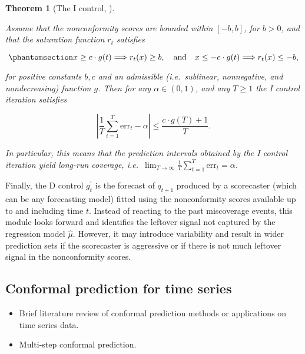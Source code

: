 \documentclass[
  11pt,
  a4paper,
]{article}
\theoremstyle{plain}
\theoremstyle{plain}
\newtheorem{theorem}{Theorem}[section]
\theoremstyle{remark}
\begin{document}
\begin{theorem}[The I control,
\textcite{angelopoulos2024}]\protect\hypertarget{thm-pid_i}{}\label{thm-pid_i}

Assume that the nonconformity scores are bounded within \([-b, b]\), for
\(b>0\), and that the saturation function \(r_t\) satisfies

\begin{equation}\phantomsection\label{eq-saturation}{
x \geq c \cdot g(t) \Longrightarrow r_t(x) \geq b, \quad \text {and} \quad x \leq-c \cdot g(t) \Longrightarrow r_t(x) \leq -b,
}\end{equation}

for positive constants \(b, c\) and an admissible (i.e.~sublinear,
nonnegative, and nondecreasing) function \(g\). Then for any
\(\alpha \in (0,1)\), and any \(T \geq 1\) the I control iteration
satisfies

\[
|\frac{1}{T}\sum_{t=1}^{T}\mathrm{err}_t - \alpha| \leq \frac{c \cdot g(T)+1}{T}.
\]

In particular, this means that the prediction intervals obtained by the
I control iteration yield long-run coverage,
i.e.~\(\lim _{T \rightarrow \infty} \frac{1}{T} \sum_{t=1}^T \mathrm{err}_t = \alpha\).

\end{theorem}

Finally, the D control \(g_t^{\prime}\) is the forecast of \(q_{t+1}\)
produced by a scorecaster (which can be any forecasting model) fitted
using the nonconformity scores available up to and including time \(t\).
Instead of reacting to the past miscoverage events, this module looks
forward and identifies the leftover signal not captured by the
regression model \(\hat{\mu}\). However, it may introduce variability
and result in wider prediction sets if the scorecaster is aggressive or
if there is not much leftover signal in the nonconformity scores.

\subsection{Conformal prediction for time series}\label{sec-review_ts}

\begin{itemize}
\item
  Brief literature review of conformal prediction methods or
  applications on time series data.
\item
  Multi-step conformal prediction.
\end{itemize}
\end{document}
